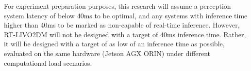





For experiment preparation purposes, this research will assume a perception system latency of below 40ms to be optimal, and any systems with inference time higher than 40ms to be marked as non-capable of real-time inference. However, RT-LIVO2DM will not be designed with a target of 40ms inference time. Rather, it will be designed with a target of as low of an inference time as possible, evaluated on the same hardware (Jetson AGX ORIN) under different computational load scenarios. 